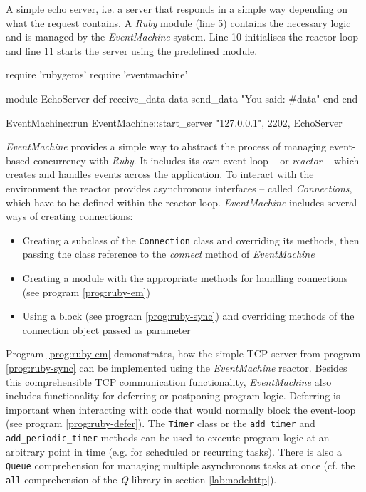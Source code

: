 \begin{program}
  \caption{A simple echo server, i.e. a server that responds in a simple way depending on what the request contains. A \textit{Ruby} module (line 5) contains the necessary logic and is managed by the \textit{EventMachine} system. Line 10 initialises the reactor loop and line 11 starts the server using the predefined module.}
  \label{prog:ruby-em}
  \begin{JavaCode}
require 'rubygems'
require 'eventmachine'

module EchoServer
    def receive_data data
        send_data "You said: #{data}"
    end
end

EventMachine::run {
    EventMachine::start_server "127.0.0.1", 2202, EchoServer
}
  \end{JavaCode}
\end{program}

\textit{EventMachine} provides a simple way to abstract the process of managing event-based concurrency with \textit{Ruby}. It includes its own event-loop -- or \textit{reactor} -- which creates and handles events across the application. To interact with the environment the reactor provides asynchronous interfaces -- called \textit{Connections}, which have to be defined within the reactor loop. \textit{EventMachine} includes several ways of creating connections:

\begin{itemize}
  \item Creating a subclass of the \texttt{Connection} class and overriding its methods, then passing the class reference to the \textit{connect} method of \textit{EventMachine}
  \item Creating a module with the appropriate methods for handling connections (see program \ref{prog:ruby-em})
  \item Using a block (see program \ref{prog:ruby-sync}) and overriding methods of the connection object passed as parameter
\end{itemize}
Program \ref{prog:ruby-em} demonstrates, how the simple TCP server from program \ref{prog:ruby-sync} can be implemented using the \textit{EventMachine} reactor. Besides this comprehensible TCP communication functionality, \textit{EventMachine} also includes functionality for deferring or postponing program logic. Deferring is important when interacting with code that would normally block the event-loop (see program \ref{prog:ruby-defer}). The \texttt{Timer} class or the \texttt{add\_timer} and \texttt{add\_periodic\_timer} methods can be used to execute program logic at an arbitrary point in time (e.g. for scheduled or recurring tasks). There is also a \texttt{Queue} comprehension for managing multiple asynchronous tasks at once (cf. the \texttt{all} comprehension of the \textit{Q} library in section \ref{lab:nodehttp}). 

